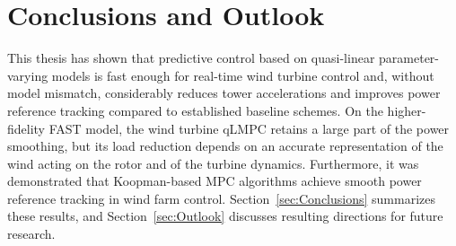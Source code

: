 \chapter{Conclusions and Outlook} \label{Conclusions}
This thesis has shown that predictive control based on quasi-linear parameter-varying models is fast enough for real-time wind turbine control and, without model mismatch, considerably reduces tower accelerations and improves power reference tracking compared to established baseline schemes. On the higher-fidelity FAST model, the wind turbine qLMPC retains a large part of the power smoothing, but its load reduction depends on an accurate representation of the wind acting on the rotor and of the turbine dynamics. Furthermore, it was demonstrated that Koopman-based MPC algorithms achieve smooth power reference tracking in wind farm control. Section~\ref{sec:Conclusions} summarizes these results, and Section~\ref{sec:Outlook} discusses resulting directions for future research.

